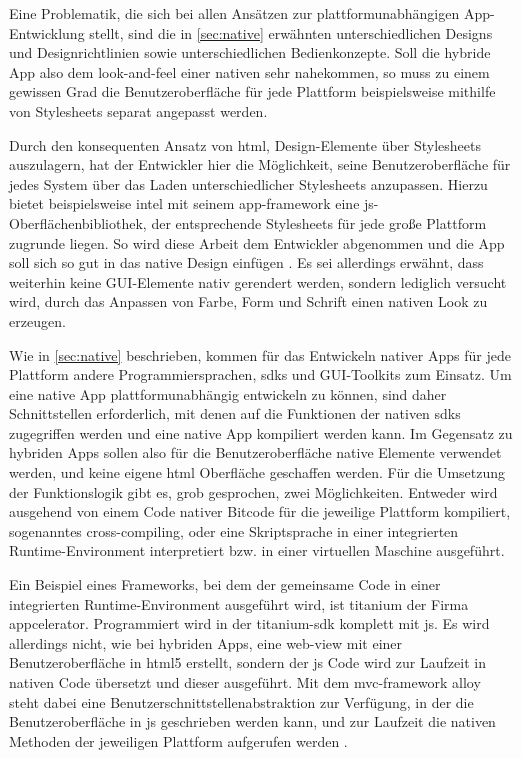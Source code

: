 Eine Problematik, die sich bei allen Ansätzen zur plattformunabhängigen App-Entwicklung stellt, sind die in \autoref{sec:native} erwähnten unterschiedlichen Designs und Designrichtlinien sowie unterschiedlichen Bedienkonzepte. Soll die hybride App also dem \gls{look-and-feel} einer nativen sehr nahekommen, so muss zu einem gewissen Grad die Benutzeroberfläche für jede Plattform beispielsweise mithilfe von Stylesheets separat angepasst werden.

Durch den konsequenten Ansatz von \gls{html}, Design-Elemente über Stylesheets auszulagern, hat der Entwickler hier die Möglichkeit, seine Benutzeroberfläche für jedes System über das Laden unterschiedlicher Stylesheets anzupassen.
Hierzu bietet beispielsweise \gls{intel} mit seinem \gls{app-framework} eine \gls{js}-Oberflächenbibliothek, der entsprechende Stylesheets für jede große Plattform zugrunde liegen. So wird diese Arbeit dem Entwickler abgenommen und die App soll sich so gut in das native Design einfügen \cite{IntelAppFramework}.
Es sei allerdings erwähnt, dass weiterhin keine GUI-Elemente nativ gerendert werden, sondern lediglich versucht wird, durch das Anpassen von Farbe, Form und Schrift einen nativen Look zu erzeugen.

Wie in \autoref{sec:native} beschrieben, kommen für das Entwickeln nativer Apps für jede Plattform andere Programmiersprachen, \glspl{sdk} und GUI-Toolkits zum Einsatz. Um eine native App plattformunabhängig entwickeln zu können, sind daher Schnittstellen erforderlich, mit denen auf die Funktionen der nativen \glspl{sdk} zugegriffen werden und eine native App kompiliert werden kann. Im Gegensatz zu hybriden Apps sollen also für die Benutzeroberfläche native Elemente verwendet werden, und keine eigene \gls{html} Oberfläche geschaffen werden. Für die Umsetzung der Funktionslogik gibt es, grob gesprochen, zwei Möglichkeiten. Entweder wird ausgehend von einem Code nativer Bitcode für die jeweilige Plattform kompiliert, sogenanntes \gls{cross-compiling}, oder eine Skriptsprache in einer integrierten Runtime-Environment interpretiert bzw. in einer virtuellen Maschine ausgeführt.

Ein Beispiel eines Frameworks, bei dem der gemeinsame Code in einer integrierten Runtime-Environment ausgeführt wird, ist \gls{titanium} der Firma \gls{appcelerator}. Programmiert wird in der  \gls{titanium}-\gls{sdk} komplett mit \gls{js}. Es wird allerdings nicht, wie bei hybriden Apps, eine \gls{web-view} mit einer Benutzeroberfläche in \gls{html5} erstellt, sondern der \gls{js} Code wird zur Laufzeit in nativen Code übersetzt und dieser ausgeführt. Mit dem \gls{mvc}-\gls{framework} \gls{alloy} steht dabei eine Benutzerschnittstellenabstraktion zur Verfügung, in der die Benutzeroberfläche in \gls{js} geschrieben werden kann, und zur Laufzeit die nativen Methoden der jeweiligen Plattform aufgerufen werden \cite{kevinwhinnery, TitaniumAlloy}.

